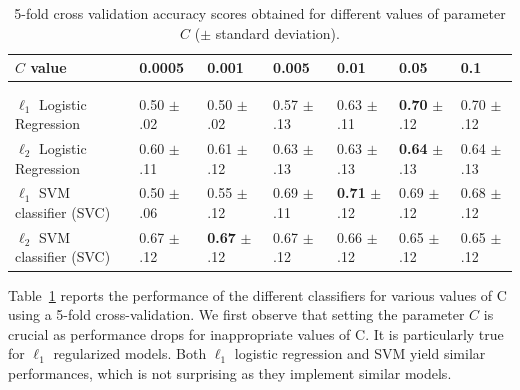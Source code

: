\documentclass{frontiersSCNS} %
\begin{document}
\begin{table}[htbp]
    \begin{center}
    \begin{tabular}{l|llllll}
        $C$ value           & 0.0005 & 0.001  & 0.005  & 0.01   & 0.05    & 0.1    \\
    \hline\\[-.9em]
    \hline\\[-.7em]
        $\ell_1$ Logistic Regression & 0.50 $\pm$ .02
                                     & 0.50 $\pm$ .02 
                                     & 0.57 $\pm$ .13
                                     & 0.63 $\pm$ .11
                                     & \textbf{0.70} $\pm$ .12
                                     & 0.70 $\pm$ .12 \\[.1em]
        $\ell_2$ Logistic Regression & 0.60 $\pm$ .11
                                     & 0.61 $\pm$ .12 
                                     & 0.63 $\pm$ .13
                                     & 0.63 $\pm$ .13
                                     & \textbf{0.64} $\pm$ .13
                                     & 0.64 $\pm$ .13 \\[.1em]
        $\ell_1$ SVM classifier (SVC)& 0.50 $\pm$ .06
                                     & 0.55 $\pm$ .12
                                     & 0.69 $\pm$ .11
                                     & \textbf{0.71} $\pm$ .12
                                     & 0.69 $\pm$ .12
                                     & 0.68 $\pm$ .12 \\[.1em]
        $\ell_2$ SVM classifier (SVC)& 0.67 $\pm$ .12
                                     & \textbf{0.67} $\pm$ .12
                                     & 0.67 $\pm$ .12
                                     & 0.66 $\pm$ .12
                                     & 0.65 $\pm$ .12
                                     & 0.65 $\pm$ .12
    \end{tabular}
    \end{center}
    \caption{5-fold cross validation accuracy scores obtained for different
    values of parameter $C$ ($\pm$ standard deviation).}
    \label{fig:miyawaki_cv}
\end{table}

Table~\ref{fig:miyawaki_cv} reports the performance of the different classifiers
for various values of C using a 5-fold cross-validation.
We first observe that setting the parameter $C$ is
crucial as performance drops for inappropriate values of C. It is particularly
true for $\ell_1$ regularized models.
Both $\ell_1$ logistic regression and SVM yield similar performances,
which is not surprising as they implement similar models.
\end{document}
